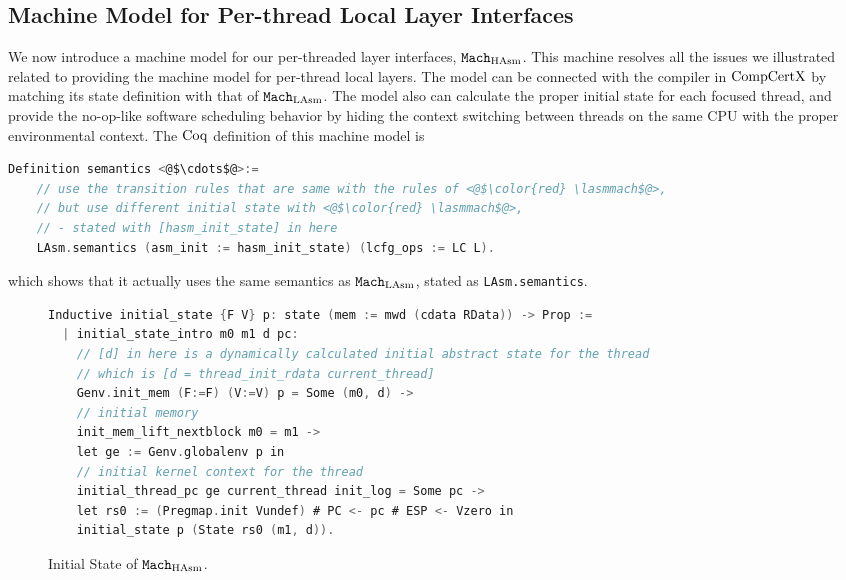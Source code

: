 \subsection{Machine Model for Per-thread Local Layer Interfaces}
\label{chapter:linking:subsec:machine-model-for-single-threaded}

We now introduce a machine model for our per-threaded layer interfaces, ${\mathrm{\texttt{Mach}}}_{\mathrm{HAsm}}$.
This machine resolves all the issues  we  illustrated related to providing the machine model for per-thread local layers. 
The model can be connected with the compiler in $\mathrm{CompCertX}$ by matching its state definition with that of ${\mathrm{\texttt{Mach}}}_{\mathrm{LAsm}}$. 
The model also can calculate the proper initial state for each focused thread,
and provide the no-op-like software scheduling behavior by hiding the context switching between threads on the same CPU with the proper environmental context. 
The $\mathrm{Coq}$ definition of this machine model is 
\begin{lstlisting}[language=C, numbersep=5pt]
  Definition semantics <@$\cdots$@>:=
    // use the transition rules that are same with the rules of <@$\color{red} \lasmmach$@>,
    // but use different initial state with <@$\color{red} \lasmmach$@>,
    // - stated with [hasm_init_state] in here
    LAsm.semantics (asm_init := hasm_init_state) (lcfg_ops := LC L).
\end{lstlisting}
which shows that it actually uses the same semantics as  ${\mathrm{\texttt{Mach}}}_{\mathrm{LAsm}}$,  stated as \lstinline$LAsm.semantics$.


\begin{figure}
\begin{lstlisting}[language=C]
Inductive initial_state {F V} p: state (mem := mwd (cdata RData)) -> Prop :=
  | initial_state_intro m0 m1 d pc:
    // [d] in here is a dynamically calculated initial abstract state for the thread
    // which is [d = thread_init_rdata current_thread]
    Genv.init_mem (F:=F) (V:=V) p = Some (m0, d) ->
    // initial memory 
    init_mem_lift_nextblock m0 = m1 ->
    let ge := Genv.globalenv p in
    // initial kernel context for the thread 
    initial_thread_pc ge current_thread init_log = Some pc ->
    let rs0 := (Pregmap.init Vundef) # PC <- pc # ESP <- Vzero in
    initial_state p (State rs0 (m1, d)).
\end{lstlisting}
\caption{Initial State of ${\mathrm{\texttt{Mach}}}_{\mathrm{HAsm}}$.}
\label{fig:chapter:linking:initial-state-of-hasm}
\end{figure}


